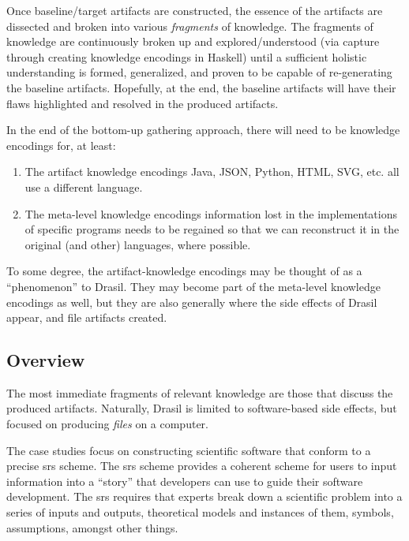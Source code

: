 Once baseline/target artifacts are constructed, the essence of the artifacts are
dissected and broken into various \textit{fragments} of knowledge. The fragments
of knowledge are continuously broken up and explored/understood (via capture
through creating knowledge encodings in Haskell) until a sufficient holistic
understanding is formed, generalized, and proven to be capable of re-generating
the baseline artifacts. Hopefully, at the end, the baseline artifacts will have
their flaws highlighted and resolved in the produced artifacts.

In the end of the bottom-up gathering approach, there will need to be knowledge
encodings for, at least:

\begin{enumerate}

      \item The artifact knowledge encodings \textemdash{} Java, JSON, Python,
            HTML, SVG, etc. all use a different language.

      \item The meta-level knowledge encodings \textemdash{} information lost in the
            implementations of specific programs needs to be regained so that we
            can reconstruct it in the original (and other) languages, where
            possible.

\end{enumerate}

To some degree, the artifact-knowledge encodings may be thought of as a
``phenomenon'' to Drasil. They may become part of the meta-level knowledge
encodings as well, but they are also generally where the side effects of Drasil
appear, and file artifacts created.

\subsection{Overview}

The most immediate fragments of relevant knowledge are those that discuss the
produced artifacts. Naturally, Drasil is limited to software-based side effects,
but focused on producing \textit{files} on a computer.

The case studies focus on constructing scientific software that conform to a
precise \acs{srs} \cite{SmithAndLai2005} scheme. The \acs{srs} scheme provides a
coherent scheme for users to input information into a ``story'' that developers
can use to guide their software development. The \acs{srs} requires that experts
break down a scientific problem into a series of inputs and outputs, theoretical
models and instances of them, symbols, assumptions, amongst other things.

